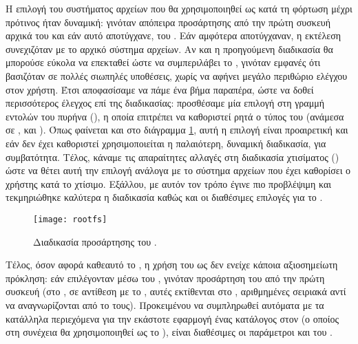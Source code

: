 Η επιλογή του συστήματος αρχείων που θα χρησιμοποιηθεί ως  κατά τη
φόρτωση μέχρι πρότινος ήταν δυναμική: γινόταν απόπειρα προσάρτησης από την
πρώτη συσκευή  αρχικά του  και εάν αυτό αποτύγχανε, του
. Εάν αμφότερα αποτύγχαναν, η εκτέλεση συνεχιζόταν με το 
αρχικό σύστημα αρχείων. Αν και η προηγούμενη διαδικασία θα μπορούσε εύκολα να
επεκταθεί ώστε να συμπεριλάβει το \viofs{}, γινόταν εμφανές ότι βασιζόταν σε
πολλές σιωπηλές υποθέσεις, χωρίς να αφήνει μεγάλο περιθώριο ελέγχου στον χρήστη.
Έτσι αποφασίσαμε να πάμε ένα βήμα παραπέρα, ώστε να δοθεί περισσότερος έλεγχος
επί της διαδικασίας: προσθέσαμε μία επιλογή \texttt{} στη γραμμή
εντολών του πυρήνα (), η οποία επιτρέπει να καθοριστεί
ρητά ο τύπος του  (ανάμεσα σε , \viofs{} και
). Όπως φαίνεται και στο διάγραμμα \ref{fig:rootfs}, αυτή η επιλογή
είναι προαιρετική και εάν δεν έχει καθοριστεί χρησιμοποιείται η παλαιότερη,
δυναμική διαδικασία, για συμβατότητα. Τέλος, κάναμε τις απαραίτητες αλλαγές στη
διαδικασία χτισίματος () ώστε να θέτει αυτή την επιλογή
ανάλογα με το σύστημα αρχείων που έχει καθορίσει ο χρήστης κατά το χτίσιμο.
Εξάλλου, με αυτόν τον τρόπο έγινε πιο προβλέψιμη και τεκμηριώθηκε καλύτερα η
διαδικασία καθώς και οι διαθέσιμες επιλογές για το .

\begin{figure}
    \centering
    \texttt{[image: rootfs]}
    \caption{Διαδικασία προσάρτησης του .}
    \label{fig:rootfs}
\end{figure}

Τέλος, όσον αφορά καθεαυτό το \viofs{}, η χρήση του ως 
δεν ενείχε κάποια αξιοσημείωτη πρόκληση: εάν επιλέγονταν μέσω του
\texttt{}, γινόταν προσάρτηση του από την πρώτη \viofs{} συσκευή
(στο \osv{}, σε αντίθεση με το \linux{}, αυτές εκτίθενται στο ,
αριθμημένες σειριακά αντί να αναγνωρίζονται από το \viofs{}  τους).
Προκειμένου να συμπληρωθεί αυτόματα με τα κατάλληλα περιεχόμενα για την εκάστοτε
εφαρμογή ένας κατάλογος στον \host{} (ο οποίος στη συνέχεια θα χρησιμοποιηθεί
ως το \viofs{} ), είναι διαθέσιμες οι παράμετροι
\texttt{} και \texttt{} του .
